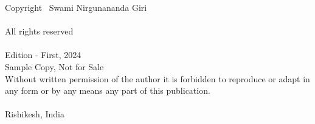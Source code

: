 \thispagestyle{empty}
Copyright \textcopyright\ Swami Nirgunananda Giri\\
\\
All rights reserved\\
\\
Edition - First, 2024\\
Sample Copy, Not for Sale\\
\vfill
Without written permission of the author it is forbidden to reproduce or adapt in any form or by any means any part of this  publication.\\
\\
Rishikesh, India\\
\newpage